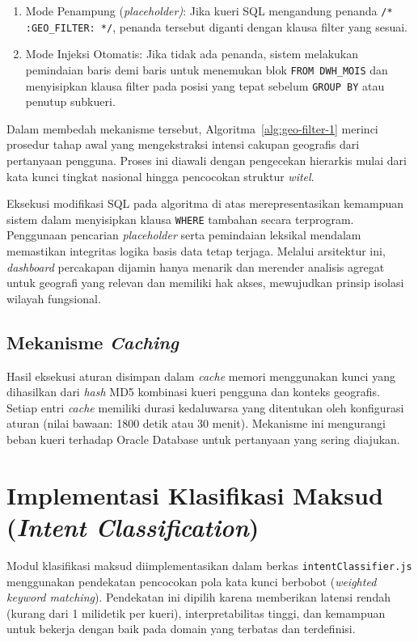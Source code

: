 \begin{enumerate}
    \item Mode Penampung (\textit{placeholder)}: Jika kueri SQL mengandung penanda \texttt{/* :GEO\_FILTER: */}, penanda tersebut diganti dengan klausa filter yang sesuai.
    \item Mode Injeksi Otomatis: Jika tidak ada penanda, sistem melakukan pemindaian baris demi baris untuk menemukan blok \texttt{FROM DWH\_MOIS} dan menyisipkan klausa filter pada posisi yang tepat sebelum \texttt{GROUP BY} atau penutup subkueri.
\end{enumerate}

Dalam membedah mekanisme tersebut, Algoritma~\ref{alg:geo-filter-1} merinci prosedur tahap awal yang mengekstraksi intensi cakupan geografis dari pertanyaan pengguna. Proses ini diawali dengan pengecekan hierarkis mulai dari kata kunci tingkat nasional hingga pencocokan struktur \textit{witel}.



Eksekusi modifikasi SQL pada algoritma di atas merepresentasikan kemampuan sistem dalam menyisipkan klausa \texttt{WHERE} tambahan secara terprogram. Penggunaan pencarian \textit{placeholder} serta pemindaian leksikal mendalam memastikan integritas logika basis data tetap terjaga. Melalui arsitektur ini, \textit{dashboard} percakapan dijamin hanya menarik dan merender analisis agregat untuk geografi yang relevan dan memiliki hak akses, mewujudkan prinsip isolasi wilayah fungsional.

\subsection{Mekanisme \textit{Caching}}

Hasil eksekusi aturan disimpan dalam \textit{cache} memori menggunakan kunci yang dihasilkan dari \textit{hash} MD5 kombinasi kueri pengguna dan konteks geografis. Setiap entri \textit{cache} memiliki durasi kedaluwarsa yang ditentukan oleh konfigurasi aturan (nilai bawaan: 1800 detik atau 30 menit). Mekanisme ini mengurangi beban kueri terhadap Oracle Database untuk pertanyaan yang sering diajukan.

\section{Implementasi Klasifikasi Maksud (\textit{Intent Classification})}
\label{sec:impl-intent}

Modul klasifikasi maksud diimplementasikan dalam berkas \texttt{intentClassifier.js} menggunakan pendekatan pencocokan pola kata kunci berbobot (\textit{weighted keyword matching}). Pendekatan ini dipilih karena memberikan latensi rendah (kurang dari 1 milidetik per kueri), interpretabilitas tinggi, dan kemampuan untuk bekerja dengan baik pada domain yang terbatas dan terdefinisi.

